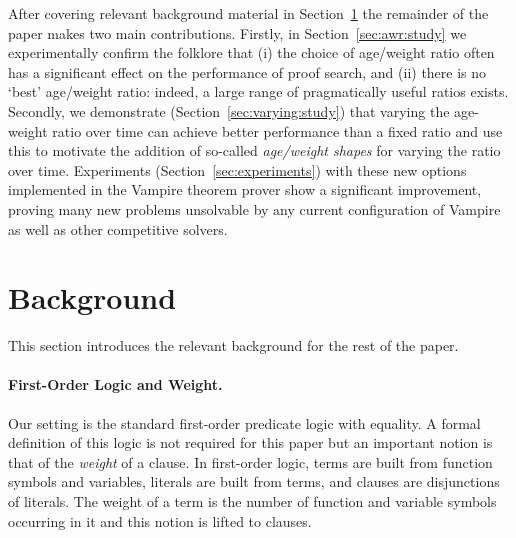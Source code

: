 \documentclass{llncs}
\begin{document}
After covering relevant background material in Section~\ref{sec:background} the remainder of the paper makes two main contributions.
Firstly, in Section~\ref{sec:awr:study} we experimentally confirm the folklore that (i) the choice of age/weight ratio often has a significant effect on the performance of proof search, and (ii) there is no `best' age/weight ratio: indeed, a large range of pragmatically useful ratios exists.
Secondly, we demonstrate (Section~\ref{sec:varying:study}) that varying the age-weight ratio over time can achieve better performance than a fixed ratio and use this to motivate the addition of so-called \emph{age/weight shapes} for varying the ratio over time.
Experiments (Section~\ref{sec:experiments}) with these new options implemented in the Vampire theorem prover show a significant improvement, proving many new problems unsolvable by any current configuration of Vampire as well as other competitive solvers.

\section{Background}
\label{sec:background}
This section introduces the relevant background for the rest of the paper.

\paragraph{First-Order Logic and Weight.} Our setting is the standard first-order predicate logic with equality. A formal definition of this logic is not required for this paper but an important notion is that of the \emph{weight} of a clause. In first-order logic,  terms are built from function symbols and variables, literals are built from terms, and clauses are disjunctions of literals. The weight of a term is the number of function and variable symbols occurring in it and this notion is lifted to clauses. 
\end{document}
